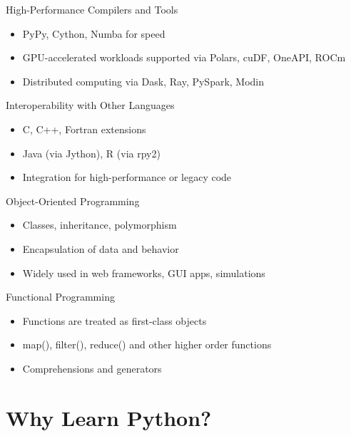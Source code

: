 \documentclass[12pt, aspectratio=169]{beamer}
\begin{document}
    \begin{frame}{High-Performance Compilers and Tools}
        \begin{itemize}
            \item PyPy, Cython, Numba for speed
            \item GPU-accelerated workloads supported via Polars, cuDF, OneAPI, ROCm
            \item Distributed computing via Dask, Ray, PySpark, Modin
        \end{itemize}
    \end{frame}


    \begin{frame}{Interoperability with Other Languages}
        \begin{itemize}
            \item C, C++, Fortran extensions
            \item Java (via Jython), R (via rpy2)
            \item Integration for high-performance or legacy code
        \end{itemize}
    \end{frame}


    \begin{frame}{Object-Oriented Programming}
        \begin{itemize}
            \item Classes, inheritance, polymorphism
            \item Encapsulation of data and behavior
            \item Widely used in web frameworks, GUI apps, simulations
        \end{itemize}
    \end{frame}


    \begin{frame}{Functional Programming}
        \begin{itemize}
            \item Functions are treated as first-class objects
            \item map(), filter(), reduce() and other higher order functions
            \item Comprehensions and generators
        \end{itemize}
    \end{frame}


    \section{Why Learn Python?}
\end{document}
